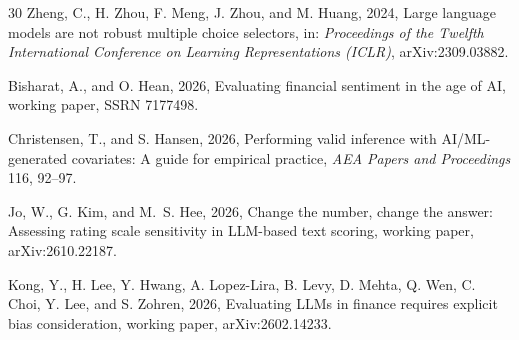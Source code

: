 \begin{thebibliography}{30}
Zheng, C., H. Zhou, F. Meng, J. Zhou, and M. Huang, 2024, Large language models are not robust multiple choice selectors, in: \emph{Proceedings of the Twelfth International Conference on Learning Representations (ICLR)}, arXiv:2309.03882.

Bisharat, A., and O. Hean, 2026, Evaluating financial sentiment in the age of {AI}, working paper, SSRN 7177498.

Christensen, T., and S. Hansen, 2026, Performing valid inference with {AI/ML}-generated covariates: {A} guide for empirical practice, \emph{AEA Papers and Proceedings} 116, 92--97.

Jo, W., G. Kim, and M.~S. Hee, 2026, Change the number, change the answer: {A}ssessing rating scale sensitivity in {LLM}-based text scoring, working paper, arXiv:2610.22187.

Kong, Y., H. Lee, Y. Hwang, A. Lopez-Lira, B. Levy, D. Mehta, Q. Wen, C. Choi, Y. Lee, and S. Zohren, 2026, Evaluating {LLM}s in finance requires explicit bias consideration, working paper, arXiv:2602.14233.

\end{thebibliography}
